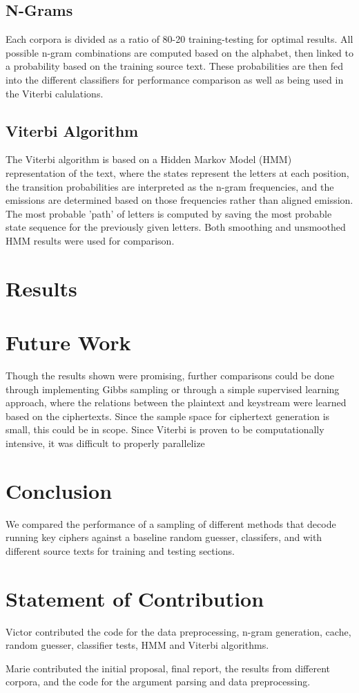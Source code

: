\documentclass[11pt,letterpaper]{article}
\begin{document}
\subsection{N-Grams}
Each corpora is divided as a ratio of 80-20 training-testing for optimal results. All possible n-gram combinations are computed based on the alphabet, then linked to a probability based on the training source text. These probabilities are then fed into the different classifiers for performance comparison as well as being used in the Viterbi calulations.

\subsection{Viterbi Algorithm}
The Viterbi algorithm is based on a Hidden Markov Model (HMM) representation of the text, where the states represent the letters at each position, the transition probabilities are interpreted as the n-gram frequencies, and the emissions are determined based on those frequencies rather than aligned emission. The most probable 'path' of letters is computed by saving the most probable state sequence for the previously given letters. Both smoothing and unsmoothed HMM results were used for comparison.

\section{Results}

\section{Future Work}
Though the results shown were promising, further comparisons could be done through implementing Gibbs sampling or through a simple supervised learning approach, where the relations between the plaintext and keystream were learned based on the ciphertexts. Since the sample space for ciphertext generation is small, this could be in scope. Since Viterbi is proven to be computationally intensive, it was difficult to properly parallelize 

\section{Conclusion}
We compared the performance of a sampling of different methods that decode running key ciphers against a baseline random guesser, classifers, and with different source texts for training and testing sections. 

\section{Statement of Contribution}
Victor contributed the code for the data preprocessing, n-gram generation, cache, random guesser, classifier tests, HMM and Viterbi algorithms.

Marie contributed the initial proposal, final report, the results from different corpora, and the code for the argument parsing and data preprocessing.



\end{document}
